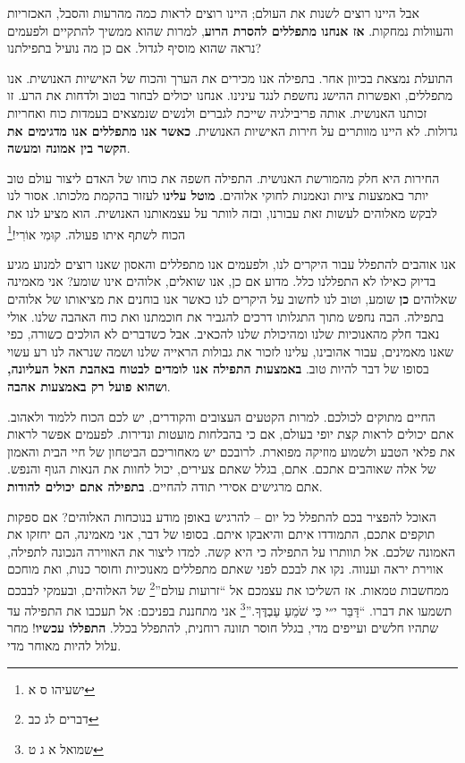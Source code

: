 \documentclass[14pt, article, extrafontsizes, twopage, a4paper]{memoir}
\begin{document}
אבל היינו רוצים לשנות את העולם; היינו רוצים לראות כמה מהרעות והסבל, האכזריות והעוולות נמחקות. \textbf{אז אנחנו מתפללים להסרת הרוע}, למרות שהוא ממשיך להתקיים ולפעמים נראה שהוא מוסיף לגדול. אם כן מה נועיל בתפילתנו?

התועלת נמצאת בכיוון אחר. בתפילה אנו מכירים את הערך והכוח של האישיות האנושית. אנו מתפללים, ואפשרות ההישג נחשפת לנגד עינינו. אנחנו יכולים לבחור בטוב ולדחות את הרע. זו זכותנו האנושית. אותה פריבילגיה שייכת לגברים ולנשים שנמצאים בעמדות כוח ואחריות גדולות. לא היינו מוותרים על חירות האישיות האנושית. \textbf{כאשר אנו מתפללים אנו מדגימים את הקשר בין אמונה ומעשה}.

החירות היא חלק מהמורשת האנושית. התפילה חשפה את כוחו של האדם ליצור עולם טוב יותר באמצעות ציות ונאמנות לחוקי אלוהים. \textbf{מוטל עלינו} לעזור בהקמת מלכותו. אסור לנו לבקש מאלוהים לעשות זאת עבורנו, ובזה לוותר על עצמאותנו האנושית. הוא מציע לנו את הכוח לשתף איתו פעולה. קוּמִי אוֹרִי!\footnote{ישעיהו ס א}

אנו אוהבים להתפלל עבור היקרים לנו, ולפעמים אנו מתפללים והאסון שאנו רוצים למנוע מגיע בדיוק כאילו לא התפללנו כלל. מדוע אם כן, אנו שואלים, אלוהים אינו שומע? אני מאמינה שאלוהים \textbf {כן} שומע, וטוב לנו לחשוב על היקרים לנו כאשר אנו בוחנים את מציאותו של אלוהים בתפילה. הבה נחפש מתוך התגלותו דרכים להגביר את חוכמתנו ואת כוח האהבה שלנו. אולי נאבד חלק מהאנוכיות שלנו ומהיכולת שלנו להכאיב. אבל כשדברים לא הולכים כשורה, כפי שאנו מאמינים, עבור אהובינו, עלינו לזכור את גבולות הראייה שלנו ושמה שנראה לנו רע עשוי בסופו של דבר להיות טוב. \textbf{באמצעות התפילה אנו לומדים לבטוח באהבת האל העליונה, ושהוא פועל רק באמצעות אהבה}.

החיים מתוקים לכולכם. למרות הקטעים העצובים והקודרים, יש לכם הכוח ללמוד ולאהוב. אתם יכולים לראות קצת יופי בעולם, אם כי בהבלחות מועטות ונדירות. לפעמים אפשר לראות את פלאי הטבע ולשמוע מוזיקה מפוארת. לרובכם יש מאחוריכם הביטחון של חיי הבית והאמון של אלה שאוהבים אתכם. אתם, בגלל שאתם צעירים, יכול לחוות את הנאות הגוף והנפש. אתם מרגישים אסירי תודה להחיים. \textbf{בתפילה אתם יכולים להודות}.

האוכל להפציר בכם להתפלל כל יום -- להרגיש באופן מודע בנוכחות האלוהים? אם ספקות תוקפים אתכם, התמודדו איתם והיאבקו איתם. בסופו של דבר, אני מאמינה, הם יחזקו את האמונה שלכם. אל תוותרו על התפילה כי היא קשה. למדו ליצור את האווירה הנכונה לתפילה, אווירת יראה וענווה. נקו את לבכם לפני שאתם מתפללים מאנוכיות וחוסר כנות, ואת מוחכם ממחשבות טמאות. אז השליכו את עצמכם אל ``זרועות עולם''\footnote{דברים לג כב} של האלוהים, ובעמקי לבבכם תשמעו את דברו. ``דַּבֵּר י״י כִּי שֹׁמֵעַ עַבְדֶּךָ.''\footnote{שמואל א ג ט} אני מתחננת בפניכם: אל תעכבו את התפילה עד שתהיו חלשים ועייפים מדי, בגלל חוסר תזונה רוחנית, להתפלל בכלל. \textbf{התפללו עכשיו}! מחר עלול להיות מאוחר מדי.
\end{document}
